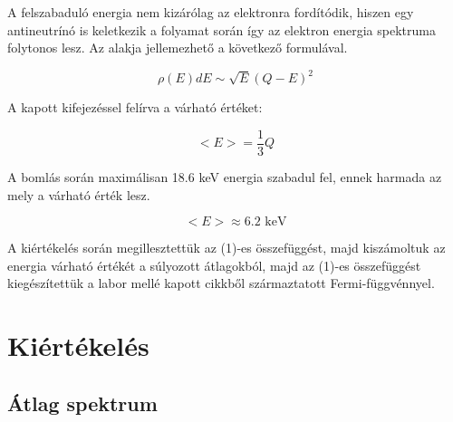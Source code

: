 \documentclass[12pt,a4paper]{article}
\theoremstyle{plain}
\begin{document}
\vspace{0.2cm}

\par A felszabaduló energia nem kizárólag az elektronra fordítódik, hiszen egy
antineutrínó is keletkezik a folyamat során így az elektron energia spektruma
folytonos lesz. Az alakja jellemezhető a következő formulával.

\vspace{0.2cm}

\begin{equation}
	\rho (E) dE \sim \sqrt{E}(Q-E)^2
\end{equation}

\vspace{0.2cm}

A kapott kifejezéssel felírva a várható értéket:

\vspace{0.2cm}

\begin{equation}
	\big<E\big> = \frac{1}{3}Q
\end{equation}

\vspace{0.2cm}

\par A bomlás során maximálisan 18.6 keV energia szabadul fel,
ennek harmada az mely a várható érték lesz.

\vspace{0.2cm}

\begin{equation}
	\big<E\big>\approx 6.2 \textrm{ keV}
\end{equation}

\vspace{0.2cm}

\par A kiértékelés során megillesztettük az (1)-es összefüggést, majd
kiszámoltuk az energia várható értékét a súlyozott átlagokból, majd az
(1)-es összefüggést kiegészítettük a labor mellé kapott cikkből származtatott
Fermi-függvénnyel.

\newpage

\section{Kiértékelés}

\subsection{Átlag spektrum}
\end{document}
